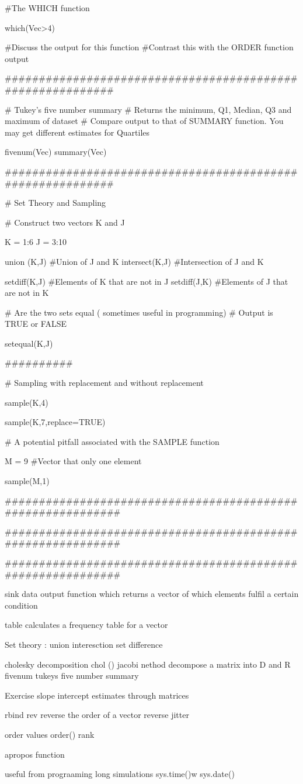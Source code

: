#The WHICH function

which(Vec>4)
	
	#Discuss the output for this function
	#Contrast this with the ORDER function output


###########################################################

# Tukey's five number summary
# Returns the minimum, Q1, Median, Q3 and maximum of dataset
# Compare output to that of SUMMARY function. You may get different estimates for Quartiles


fivenum(Vec)
summary(Vec)

###########################################################

# Set Theory and Sampling

# Construct two vectors K and J

K = 1:6
J = 3:10

union (K,J)		#Union of J and K
intersect(K,J)		#Intersection of J and K	
			
setdiff(K,J)		#Elements of K that are not in J
setdiff(J,K)		#Elements of J that are not in K

# Are the two sets equal ( sometimes useful in programming)
# Output is TRUE or FALSE

setequal(K,J)

##########

# Sampling with replacement and without replacement

sample(K,4)

sample(K,7,replace=TRUE)



# A potential pitfall associated with the SAMPLE function

M = 9			#Vector that only one element

sample(M,1)

############################################################



############################################################



############################################################

sink data output function 
which returns a vector of which elements fulfil a certain condition

table calculates a frequency table for a vector


Set theory : union interesction set difference

cholesky decomposition
 chol ()
jacobi nethod 
decompose a matrix into D and R
fivenum tukeys five number summary

Exercise
slope intercept estimates through matrices

rbind
rev reverse the order of a vector
reverse
jitter

order values order() rank

apropos function

 useful from prograaming long simulations
sys.time()w
sys.date()

